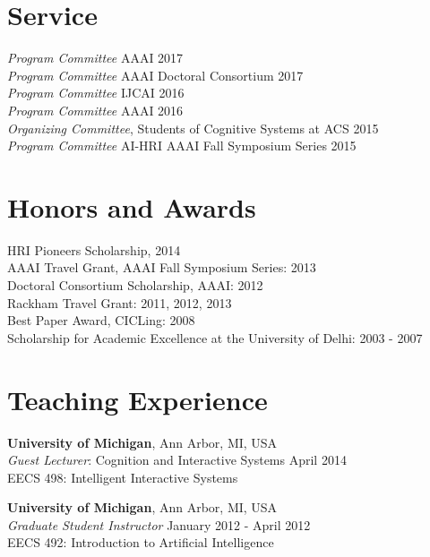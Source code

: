 \documentclass[margin,line,11pt]{res}
\begin{document}
\begin{resume}
                  \section{\sc Service}
                  \emph{Program Committee} AAAI \hfill 2017\\
                  \emph{Program Committee} AAAI Doctoral Consortium \hfill 2017\\
                  \emph{Program Committee} IJCAI \hfill 2016\\
                  \emph{Program Committee} AAAI \hfill 2016\\
                  \emph{Organizing Committee}, Students of Cognitive Systems at ACS \hfill 2015\\
                  \emph{Program Committee} AI-HRI AAAI Fall Symposium Series 2015\\



                  \section{\sc Honors and Awards} 
                  HRI Pioneers Scholarship, 2014\\
                  AAAI Travel Grant, AAAI Fall Symposium Series: 2013\\
                  Doctoral Consortium Scholarship, AAAI: 2012 \\
                  Rackham Travel Grant: 2011, 2012, 2013 \\
                  Best Paper Award, CICLing: 2008 \\
                  Scholarship for Academic Excellence at the University of Delhi: 2003 - 2007 

                  \section{\sc Teaching Experience}
                  \textbf{University of Michigan}, Ann Arbor, MI, USA
                  \\ \emph{Guest Lecturer}: Cognition and Interactive
                  Systems \hfill April 2014 \\ EECS 498: Intelligent
                  Interactive Systems

                  \textbf{University of Michigan}, Ann Arbor, MI, USA \\
                  \emph{Graduate Student Instructor} \hfill January 2012 - April 2012 \\
                  EECS 492: Introduction to Artificial Intelligence


\end{resume}
\end{document}
